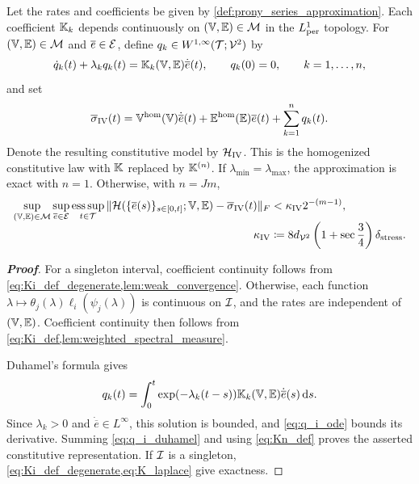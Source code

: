 {\begin{proposition}\label{prop:uniform_prony_homogenized_model}
Let the rates and coefficients be given by \cref{def:prony_series_approximation}. Each coefficient $\mathbb{K}_k$ depends continuously on $(\mathbb{V},\mathbb{E})\in{\mathcal{M}}$ in the $L^1_{\rm per}$ topology. For $(\mathbb{V},\mathbb{E})\in{\mathcal{M}}$ and $\overline e\in{\mathcal{E}}$, define $q_k\in W^{1,\infty}({\mathcal{T}};{\mathcal{V}}^2)$ by
\begin{equation}\label{eq:q_i_ode}
\dot q_k(t)+\lambda_k q_k(t)=\mathbb{K}_k(\mathbb{V},\mathbb{E})\dot{\overline e}(t),\qquad q_k(0)=0,\qquad k=1,\dots,n,
\end{equation}
and set
\begin{equation}\label{eq:prony_homogenized_model}
\overline\sigma_{\rm IV}(t)=\mathbb{V}^{\rm hom}(\mathbb{V})\dot{\overline e}(t)+\mathbb{E}^{\rm hom}(\mathbb{E})\overline e(t)+\sum_{k=1}^n q_k(t).
\end{equation}
Denote the resulting constitutive model by ${\mathcal{H}}_{\rm IV}$. This is the homogenized constitutive law with $\mathbb{K}$ replaced by $\mathbb{K}^{(n)}$. If $\lambda_{\min}=\lambda_{\max}$, the approximation is exact with $n=1$. Otherwise, with $n=Jm$,
\begin{align}\label{eq:prony_homogenized_error_uniform}
\sup_{(\mathbb{V},\mathbb{E})\in{\mathcal{M}}}\sup_{\overline e\in{\mathcal{E}}}\operatorname*{ess\,sup}_{t\in{\mathcal{T}}}\|{\mathcal{H}}(\{\overline e(s)\}_{s\in[0,t]};\mathbb{V},\mathbb{E})-\overline\sigma_{\rm IV}(t)\|_F
&<\kappa_{\rm IV}2^{-(m-1)},\\[-1ex]
\kappa_{\rm IV}&\coloneqq8d_{{\mathcal{V}}^2}\left(1+\sec\frac34\right)\delta_{\rm stress}.\nonumber
\end{align}
\end{proposition}

\begin{proof}[\bf Proof]
For a singleton interval, coefficient continuity follows from \cref{eq:Ki_def_degenerate,lem:weak_convergence}. Otherwise, each function $\lambda\mapsto\theta_j(\lambda)\ell_i(\psi_j(\lambda))$ is continuous on ${\mathcal{I}}$, and the rates are independent of $(\mathbb{V},\mathbb{E})$. Coefficient continuity then follows from \cref{eq:Ki_def,lem:weighted_spectral_measure}.

Duhamel's formula gives
\begin{equation}\label{eq:q_i_duhamel}
q_k(t)=\int_0^t\exp(-\lambda_k(t-s))\mathbb{K}_k(\mathbb{V},\mathbb{E})\dot{\overline e}(s)\,\mathrm ds.
\end{equation}
Since $\lambda_k>0$ and $\dot{\overline e}\in L^\infty$, this solution is bounded, and \cref{eq:q_i_ode} bounds its derivative. Summing \cref{eq:q_i_duhamel} and using \cref{eq:Kn_def} proves the asserted constitutive representation. If ${\mathcal{I}}$ is a singleton, \cref{eq:Ki_def_degenerate,eq:K_laplace} give exactness.


\end{proof}}
